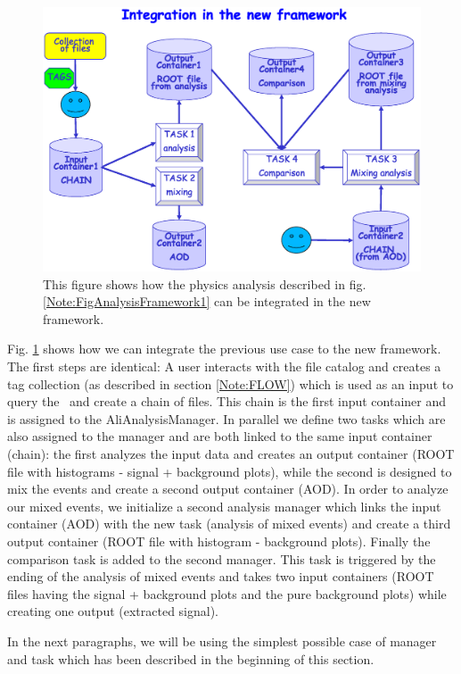 \begin{figure}[ht!]
\begin{center}
\includegraphics[width=15cm]{figures/AnalysisFramework-2.eps}
\end{center}
\caption{This figure shows how the physics analysis described in fig. \ref{Note:FigAnalysisFramework1} can be integrated in the new framework.}
\label{Note:FigAnalysisFramework2}
\end{figure}

Fig. \ref{Note:FigAnalysisFramework2} shows how we can integrate the previous use case to the new framework. The first steps are identical: A user interacts with the file catalog and creates a tag collection (as described in section \ref{Note:FLOW}) which is used as an input to query the \tag ~and create a chain of files. This chain is the first input container and is assigned to the {\ttfamily AliAnalysisManager}. In parallel we define two tasks which are also assigned to the manager and are both linked to the same input container (chain): the first analyzes the input data and creates an output container (ROOT file with histograms - signal + background plots), while the second is designed to mix the events and create a second output container (AOD). In order to analyze our mixed events, we initialize a second analysis manager which links the input container (AOD) with the new task (analysis of mixed events) and create a third output container (ROOT file with histogram - background plots). Finally the comparison task is added to the second manager. This task is triggered by the ending of the analysis of mixed events and takes two input containers (ROOT files having the signal + background plots and the pure background plots) while creating one output (extracted signal).

In the next paragraphs, we will be using the simplest possible case of manager and task which has been described in the beginning of this section.





